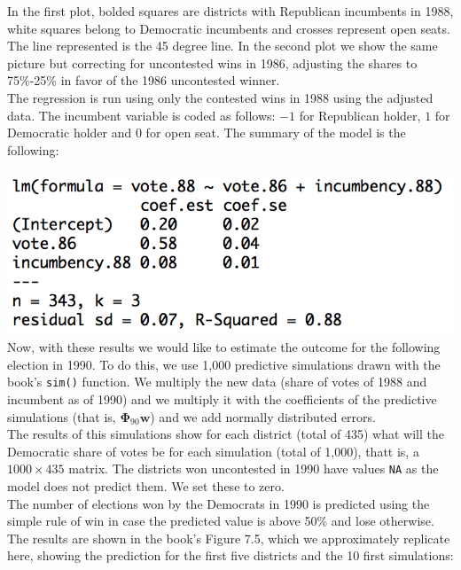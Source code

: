 \documentclass[a4paper, 11pt]{article}
\begin{document}
\begin{figure}[H]
\begin{subfigure}{.5\textwidth}
\end{subfigure}
\end{figure}
In the first plot, bolded squares are districts with Republican incumbents in 1988, white squares belong to Democratic incumbents and crosses represent open seats. The line represented is the 45 degree line. In the second plot we show the same picture but correcting for uncontested wins in 1986, adjusting the shares to 75\%-25\% in favor of the 1986 uncontested winner.\\
\newline The regression is run using only the contested wins in 1988 using the adjusted data. The incumbent variable is coded as follows: $-1$ for Republican holder, $1$ for Democratic holder and $0$ for open seat. The summary of the model is the following:\\
\newline \\
\includegraphics[scale=0.7]{plot_ex4_4.png}
\newline \\
\newline Now, with these results we would like to estimate the outcome for the following election in 1990. To do this, we use 1,000 predictive simulations drawn with the book's \texttt{sim()} function. We multiply the new data (share of votes of 1988 and incumbent as of 1990) and we multiply it with the coefficients of the predictive simulations (that is, $\mathbf{\Phi}_{90} \mathbf{w}$) and we add normally distributed errors.\\
\newline The results of this simulations show for each district (total of 435) what will the Democratic share of votes be for each simulation (total of 1,000), thatt is, a $1000 \times 435$ matrix. The districts won uncontested in 1990 have values \texttt{NA} as the model does not predict them. We set these to zero.\\
\newline The number of elections won by the Democrats in 1990 is predicted using the simple rule of win in case the predicted value is above 50\% and lose otherwise. The results are shown in the book's Figure 7.5, which we approximately replicate here, showing the prediction for the first five districts and the 10 first simulations:
\end{document}
